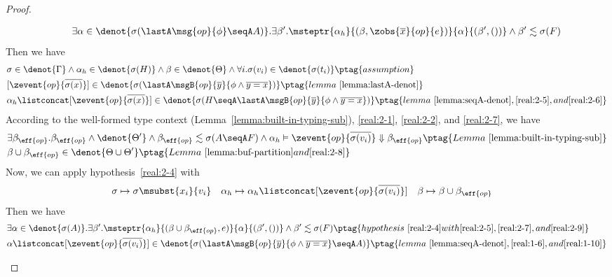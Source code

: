 \begin{proof}
\begin{enumerate}[label=Case]
{\footnotesize\begin{align*}
    \qquad \exists \alpha \in \denot{\sigma(\lastA\msg{op}{\phi} \seqA A)}.\exists \beta'. \msteptr{\alpha_h}{(\beta, \zobs{\overline{x}}{op}{e})}{\alpha}{(\beta', ())} \land \beta' \realz \sigma(F)
\end{align*}}\noindent
Then we have
{\footnotesize\begin{alignat}{2}
&\sigma \in \denot{\Gamma} \land \alpha_h \in \denot{\sigma(H)} \land \beta \in \denot{\Theta} \land \forall i. \sigma(v_i) \in\denot{\sigma(t_i)} \ptag{assumption} \label{real:2-5}
\\& [\zevent{op}{\overline{\sigma(x)}}] \in \denot{\sigma(\lastA\msgB{op}{\overline{y}}{\phi \land \overline{y = x}})} \ptag{lemma~\ref{lemma:lastA-denot}} \label{real:2-6}
\\& \alpha_h \listconcat [\zevent{op}{\overline{\sigma(x)}}] \in \denot{\sigma(H \seqA \lastA\msgB{op}{\overline{y}}{\phi \land \overline{y = x}})} \ptag{lemma~\ref{lemma:seqA-denot}, \ref{real:2-5}, and \ref{real:2-6}} \label{real:2-7}
\end{alignat}}\noindent
According to the well-formed type context (Lemma~\ref{lemma:built-in-typing-sub}), \ref{real:2-1}, \ref{real:2-2}, and \ref{real:2-7}, we have
{\footnotesize\begin{alignat}{2}
& \exists \beta_{\eff{op}}. \beta_{\eff{op}} \land \denot{\Theta'} \land \beta_{\eff{op}} \realz \sigma(A\seqA F) \land \alpha_h \vDash \zevent{op}{\overline{\sigma(v_i)}} \Downarrow \beta_{\eff{op}} \ptag{Lemma~\ref{lemma:built-in-typing-sub}} \label{real:2-8}
\\& \beta \cup \beta_{\eff{op}} \in  \denot{ \Theta \cup \Theta'} \ptag{Lemma~\ref{lemma:buf-partition} and \ref{real:2-8}} \label{real:2-9}
\end{alignat}}\noindent
Now, we can apply hypothesis~\ref{real:2-4} with
{\footnotesize\begin{align*}
    &\sigma \mapsto \sigma\msubst{x_i}{v_i} \quad \alpha_h \mapsto \alpha_h \listconcat [\zevent{op}{\overline{\sigma(v_i)}}] \quad \beta \mapsto \beta \cup \beta_{\eff{op}}
\end{align*}}\noindent
Then we have
{\footnotesize\begin{alignat}{2}
&\exists \alpha \in\denot{\sigma(A)}. \exists \beta'. \msteptr{\alpha_h}{(\beta \cup \beta_{\eff{op}}, e)}{\alpha}{(\beta', ())} \land \beta' \realz \sigma(F) \ptag{hypothesis~\ref{real:2-4} with \ref{real:2-5}, \ref{real:2-7}, and \ref{real:2-9}} \label{real:2-10}
\\& \alpha \listconcat [\zevent{op}{\overline{\sigma(v_i)}}] \in \denot{\sigma(\lastA\msgB{op}{\overline{y}}{\phi \land \overline{y = x}} \seqA A)} \ptag{lemma~\ref{lemma:seqA-denot}, \ref{real:1-6}, and \ref{real:1-10}} \label{real:1-11}

\end{alignat}}
\end{enumerate}
\end{proof}
